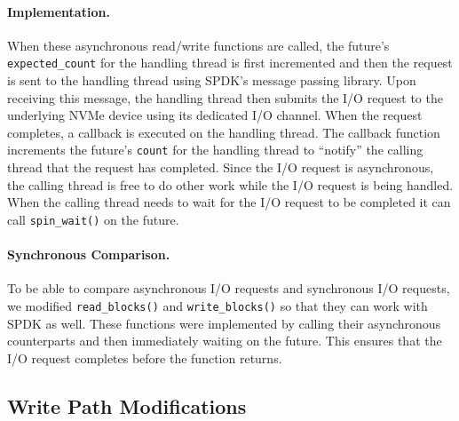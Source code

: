\paragraph{Implementation.}
When these asynchronous read/write functions are called, the future's {\tt
expected\_count} for the handling thread is first incremented and then the
request is sent to the handling thread using SPDK's message passing library.
Upon receiving this message, the handling thread then submits the I/O request
to the underlying NVMe device using its dedicated I/O channel. When the request
completes, a callback is executed on the handling thread. The callback function
increments the future's {\tt count} for the handling thread to ``notify'' the
calling thread that the request has completed. Since the I/O request is
asynchronous, the calling thread is free to do other work while the I/O request
is being handled. When the calling thread needs to wait for the I/O request to
be completed it can call {\tt spin\_wait()} on the future.

\paragraph{Synchronous Comparison.}
To be able to compare asynchronous I/O requests and synchronous I/O
requests, we modified {\tt read\_blocks()} and {\tt write\_blocks()} so that
they can work with SPDK as well. These functions were implemented by calling
their asynchronous counterparts and then immediately waiting on the future.
This ensures that the I/O request completes before the function returns.

\subsection{Write Path Modifications}
